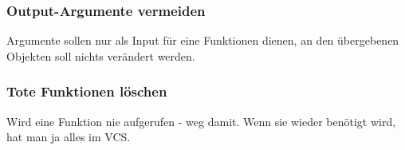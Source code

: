 \subsubsection{Output-Argumente vermeiden}
Argumente sollen nur als Input für eine Funktionen dienen, an den übergebenen Objekten soll nichts verändert werden.
\subsubsection{Tote Funktionen löschen}
Wird eine Funktion nie aufgerufen - weg damit. Wenn sie wieder benötigt wird, hat man ja alles im VCS.